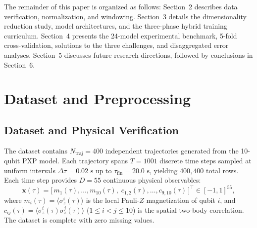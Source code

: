 \documentclass[10pt,a4paper]{article}
\begin{document}
The remainder of this paper is organized as follows: Section~2 describes data verification, normalization, and windowing. Section~3 details the dimensionality reduction study, model architectures, and the three-phase hybrid training curriculum. Section~4 presents the 24-model experimental benchmark, 5-fold cross-validation, solutions to the three challenges, and disaggregated error analyses. Section~5 discusses future research directions, followed by conclusions in Section~6.

\section{Dataset and Preprocessing}

\subsection{Dataset and Physical Verification}
The dataset contains $N_{\text{traj}} = 400$ independent trajectories generated from the 10-qubit PXP model. Each trajectory spans $T = 1001$ discrete time steps sampled at uniform intervals $\Delta \tau = 0.02\text{ s}$ up to $\tau_{\text{fin}} = 20.0\text{ s}$, yielding $400{,}400$ total rows. Each time step provides $D = 55$ continuous physical observables:
\begin{equation}
    \mathbf{x}(\tau) = \bigl[\, m_1(\tau), \dots, m_{10}(\tau), \; c_{1,2}(\tau), \dots, c_{9,10}(\tau) \,\bigr]^\top \in [-1, 1]^{55},
\end{equation}
where $m_i(\tau) = \langle \sigma_z^i(\tau) \rangle$ is the local Pauli-$Z$ magnetization of qubit $i$, and $c_{ij}(\tau) = \langle \sigma_z^i(\tau)\sigma_z^j(\tau) \rangle$ ($1 \le i < j \le 10$) is the spatial two-body correlation. The dataset is complete with zero missing values.
\end{document}
